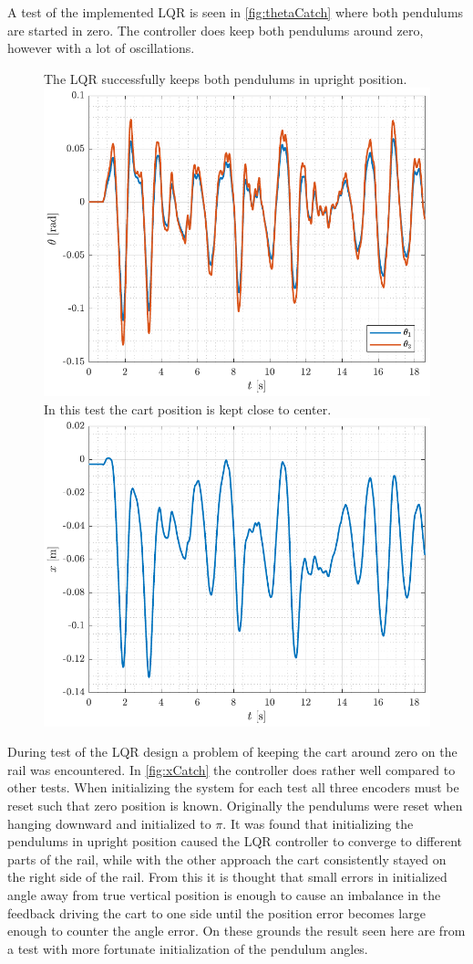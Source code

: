 %
%
A test of the implemented LQR is seen in \autoref{fig:thetaCatch} where both pendulums are started in zero. The controller does keep both pendulums around zero, however with a lot of oscillations.
%
\begin{figure}[H]
  \hspace{-10pt}
  \captionbox
  {
    The LQR successfully keeps both pendulums in upright position.
    \label{fig:thetaCatch}
  }
  {
    \hspace{-1cm}
    \includegraphics[width=.5\textwidth]{figures/thetaCatch}
  }
  \hspace{20pt}
  \captionbox 
  {
    In this test the cart position is kept close to center.
    \label{fig:xCatch}
  }
  {
    \hspace{-1cm}
    \includegraphics[width=.5\textwidth]{figures/xCatch}
  }  
\end{figure}
During test of the LQR design a problem of keeping the cart around zero on the rail was encountered. In \autoref{fig:xCatch} the controller does rather well compared to other tests. When initializing the system for each test all three encoders must be reset such that zero position is known. Originally the pendulums were reset when hanging downward and initialized to $\pi$. It was found that initializing the pendulums in upright position caused the LQR controller to converge to different parts of the rail, while with the other approach the cart consistently stayed on the right side of the rail. From this it is thought that small errors in initialized angle away from true vertical position is enough to cause an imbalance in the feedback driving the cart to one side until the position error becomes large enough to counter the angle error. On these grounds the result seen here are from a test with more fortunate initialization of the pendulum angles.\\
